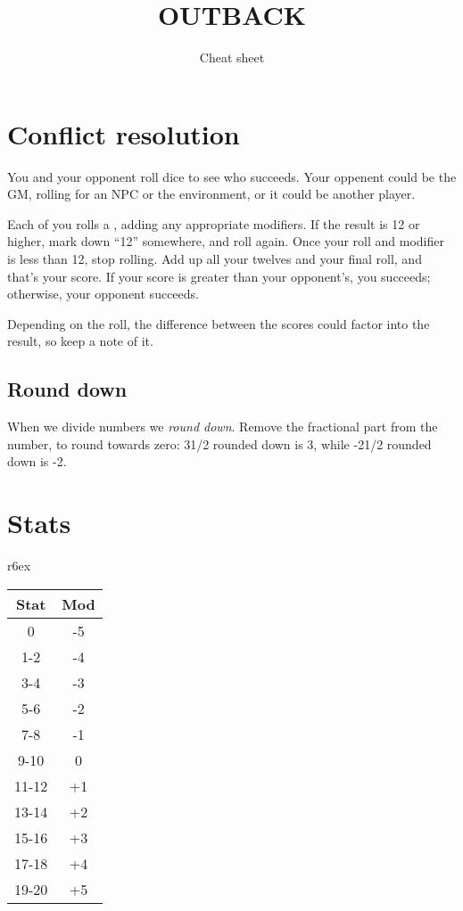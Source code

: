 \documentclass[10pt, a4paper, twocolumn]{article}
\title{\uppercase{Outback}}
\subtitle{Cheat sheet}
\date{}
\begin{document}
\maketitle

\section{Conflict resolution}
You and your opponent roll dice to see who succeeds. Your oppenent could be the
GM, rolling for an NPC or the environment, or it could be another player.

Each of you rolls a , adding any appropriate modifiers. If the result
is 12 or higher, mark down ``12'' somewhere, and roll again. Once your roll and
modifier is less than 12, stop rolling. Add up all your twelves and your final
roll, and that's your score. If your score is greater than your opponent's, you
succeeds; otherwise, your opponent succeeds.

Depending on the roll, the difference between the scores could factor into the
result, so keep a note of it. 

\subsection{Round down}
When we divide numbers we \emph{round down}. Remove the fractional part from the
number, to round towards zero: 3{1/2} rounded down is 3, while -2{1/2} rounded
down is -2. 

\section{Stats}

\begin{wraptable}[10]{r}{6ex}
  \small
\vspace*{-7ex}
\hspace*{-4.5ex}
\begin{tabular}{cc}
  Stat  & Mod \\
  \hline 
  0     & -5       \\
  1-2   & -4       \\
  3-4   & -3       \\
  5-6   & -2       \\
  7-8   & -1       \\
  9-10  &  0       \\
  11-12 & +1       \\
  13-14 & +2       \\
  15-16 & +3       \\
  17-18 & +4       \\
  19-20 & +5
\end{tabular}
\end{wraptable}
\end{document}
